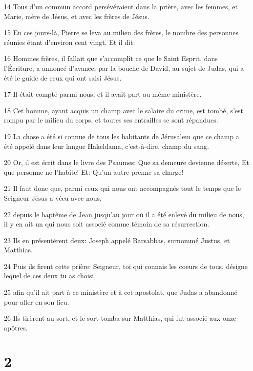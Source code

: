 \par 14 Tous d'un commun accord persévéraient dans la prière, avec les femmes, et Marie, mère de Jésus, et avec les frères de Jésus.
\par 15 En ces jours-là, Pierre se leva au milieu des frères, le nombre des personnes réunies étant d'environ cent vingt. Et il dit:
\par 16 Hommes frères, il fallait que s'accomplît ce que le Saint Esprit, dans l'Écriture, a annoncé d'avance, par la bouche de David, au sujet de Judas, qui a été le guide de ceux qui ont saisi Jésus.
\par 17 Il était compté parmi nous, et il avait part au même ministère.
\par 18 Cet homme, ayant acquis un champ avec le salaire du crime, est tombé, s'est rompu par le milieu du corps, et toutes ses entrailles se sont répandues.
\par 19 La chose a été si connue de tous les habitants de Jérusalem que ce champ a été appelé dans leur langue Hakeldama, c'est-à-dire, champ du sang.
\par 20 Or, il est écrit dans le livre des Psaumes: Que sa demeure devienne déserte, Et que personne ne l'habite! Et: Qu'un autre prenne sa charge!
\par 21 Il faut donc que, parmi ceux qui nous ont accompagnés tout le temps que le Seigneur Jésus a vécu avec nous,
\par 22 depuis le baptême de Jean jusqu'au jour où il a été enlevé du milieu de nous, il y en ait un qui nous soit associé comme témoin de sa résurrection.
\par 23 Ils en présentèrent deux: Joseph appelé Barsabbas, surnommé Justus, et Matthias.
\par 24 Puis ils firent cette prière: Seigneur, toi qui connais les coeurs de tous, désigne lequel de ces deux tu as choisi,
\par 25 afin qu'il ait part à ce ministère et à cet apostolat, que Judas a abandonné pour aller en son lieu.
\par 26 Ils tirèrent au sort, et le sort tomba sur Matthias, qui fut associé aux onze apôtres.

\chapter{2}

